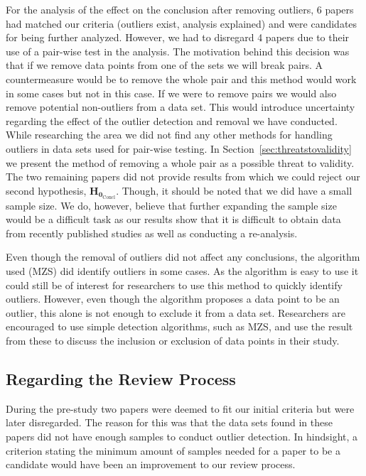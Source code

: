 For the analysis of the effect on the conclusion after removing outliers, 6 papers had matched our criteria (outliers exist, analysis explained) and were candidates for being further analyzed. However, we had to disregard 4 papers due to their use of a pair-wise test in the analysis. The motivation behind this decision was that if we remove data points from one of the sets we will break pairs. A countermeasure would be to remove the whole pair and this method would work in some cases but not in this case. If we were to remove pairs we would also remove potential non-outliers from a data set. This would introduce uncertainty regarding the effect of the outlier detection and removal we have conducted. While researching the area we did not find any other methods for handling outliers in data sets used for pair-wise testing. In Section~\ref{sec:threatstovalidity} we present the method of removing a whole pair as a possible threat to validity. The two remaining papers did not provide results from which we could reject our second hypothesis, $\mathbf{H_{0_{\mathrm{Concl}}}}$. Though, it should be noted that we did have a small sample size. We do, however, believe that further expanding the sample size would be a difficult task as our results show that it is difficult to obtain data from recently published studies as well as conducting a re-analysis.




Even though the removal of outliers did not affect any conclusions, the algorithm used (MZS) did identify outliers in some cases. As the algorithm is easy to use it could still be of interest for researchers to use this method to quickly identify outliers. However, even though the algorithm proposes a data point to be an outlier, this alone is not enough to exclude it from a data set. Researchers are encouraged to use simple detection algorithms, such as MZS, and use the result from these to discuss the inclusion or exclusion of data points in their study.




\subsection{Regarding the Review Process}
\label{sec:discussion-method}
During the pre-study two papers were deemed to fit our initial criteria but were later disregarded. The reason for this was that the data sets found in these papers did not have enough samples to conduct outlier detection. In hindsight, a criterion stating the minimum amount of samples needed for a paper to be a candidate would have been an improvement to our review process.


